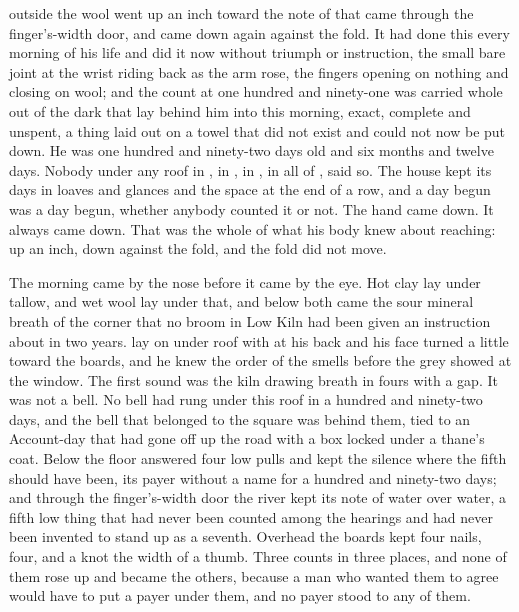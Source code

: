 
 outside the wool went up an inch toward the note of  that came through the finger's-width door, and came down again against the fold. It had done this every morning of his life and did it now without triumph or instruction, the small bare joint at the wrist riding back as the arm rose, the fingers opening on nothing and closing on wool; and the count at one hundred and ninety-one was carried whole out of the dark that lay behind him into this morning, exact, complete and unspent, a thing laid out on a towel that did not exist and could not now be put down. He was one hundred and ninety-two days old and six months and twelve days. Nobody under any roof in , in , in , in all of , said so. The house kept its days in loaves and glances and the space at the end of a row, and a day begun was a day begun, whether anybody counted it or not. The hand came down. It always came down. That was the whole of what his body knew about reaching: up an inch, down against the fold, and the fold did not move.

The morning came by the nose before it came by the eye. Hot clay lay under tallow, and wet wool lay under that, and below both came the sour mineral breath of the corner that no broom in Low Kiln had been given an instruction about in two years.  lay on  under  roof with  at his back and his face turned a little toward the boards, and he knew the order of the smells before the grey showed at the window. The first sound was the kiln drawing breath in fours with a gap. It was not a bell. No bell had rung under this roof in a hundred and ninety-two days, and the bell that belonged to the square was behind them, tied to an Account-day that had gone off up the road with a box locked under a thane's coat. Below the floor  answered four low pulls and kept the silence where the fifth should have been, its payer without a name for a hundred and ninety-two days; and through the finger's-width door the river kept its note of water over water, a fifth low thing that had never been counted among the hearings and had never been invented to stand up as a seventh. Overhead the boards kept four nails, four, and a knot the width of a thumb. Three counts in three places, and none of them rose up and became the others, because a man who wanted them to agree would have to put a payer under them, and no payer stood to any of them.

